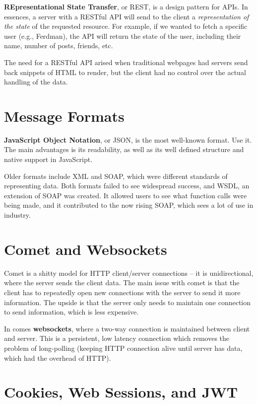 \documentclass{report}
\newcommand{\npar}{\par\noindent}
\newcommand{\vpar}{\vspace{1em}\npar}
\begin{document}
\par \textbf{REpresentational State Transfer}, or REST, is a design pattern for APIs. In essences, a server with a RESTful API will send to the client a \textit{representation of the state} of the requested resource. For example, if we wanted to fetch a specific user (e.g., Ferdman), the API will return the state of the user, including their name, number of posts, friends, etc.

\vpar The need for a RESTful API arised when traditional webpages had servers send back snippets of HTML to render, but the client had no control over the actual handling of the data.

\section{Message Formats}

\par \textbf{JavaScript Object Notation}, or JSON, is the most well-known format. Use it. The main advantages is its readability, as well as its well defined structure and native support in JavaScript.

\vpar Older formats include XML and SOAP, which were different standards of representing data. Both formats failed to see widespread success, and WSDL, an extension of SOAP was created. It allowed users to see what function calls were being made, and it contributed to the now rising SOAP, which sees a lot of use in industry.

\section{Comet and Websockets}

\par Comet is a shitty model for HTTP client/server connections -- it is unidirectional, where the server sends the client data. The main issue with comet is that the client has to repeatedly open new connections with the server to send it more information. The upside is that the server only needs to maintain one connection to send information, which is less expensive.

\vpar In comes \textbf{websockets}, where a two-way connection is maintained between client and server. This is a persistent, low latency connection which removes the problem of long-polling (keeping HTTP connection alive until server has data, which had the overhead of HTTP).

\section{Cookies, Web Sessions, and JWT}
\end{document}
